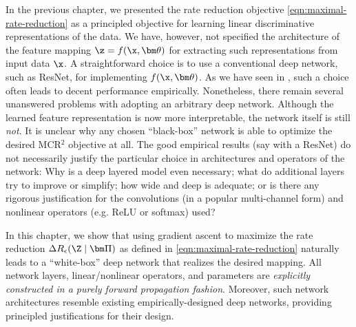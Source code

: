 \documentclass[../../book-main.tex]{subfiles}
\begin{document}
In the previous chapter, we presented the rate reduction objective
\eqref{eqn:maximal-rate-reduction} as a principled objective for
learning linear discriminative representations of the data. We have,
however, not specified the architecture of the feature mapping $\z =
f(\x, \bm \theta)$ for extracting such representations from input data $\x$.
A straightforward choice is to use a conventional deep network, such
as ResNet, for implementing $f(\x, \bm \theta)$. As we have seen in
, such a choice often leads to decent
performance empirically. Nonetheless, there remain several unanswered
problems with adopting an arbitrary deep network. Although the
learned feature representation is now more interpretable, the network
itself is still {\em not}. It is unclear why any chosen ``black-box''
network is able to optimize the desired MCR$^2$ objective at all. The
good empirical results (say with a ResNet) do not necessarily justify
the particular choice in architectures and operators of the network:
Why is a deep layered model even necessary; what do additional layers
try to improve or simplify; how wide and deep is adequate; or is
there any rigorous justification for the convolutions (in a popular
multi-channel form) and nonlinear operators (e.g. ReLU or softmax) used?

In this chapter, we show that using gradient ascent to maximize the
rate reduction $\Delta R_{\epsilon}(\Z \mid \bm \Pi)$ as defined in
\eqref{eqn:maximal-rate-reduction} naturally leads to a ``white-box''
deep network that realizes the desired mapping. All network layers,
linear/nonlinear operators, and parameters are {\em explicitly
constructed in a purely forward propagation fashion}. Moreover, such
network architectures resemble existing empirically-designed deep
networks, providing principled justifications for their design.
\end{document}
